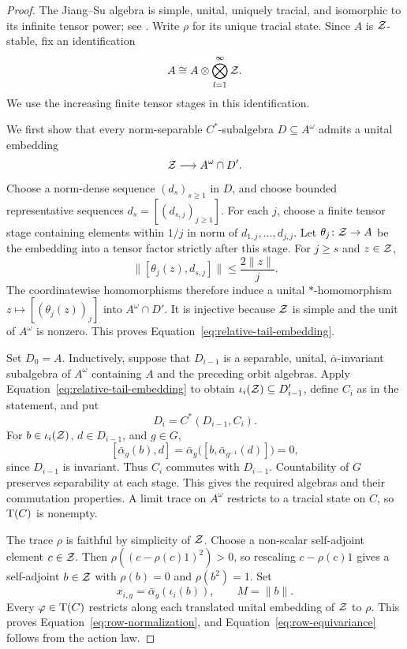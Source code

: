 \begin{proof}
The Jiang--Su algebra is simple, unital, uniquely tracial, and
isomorphic to its infinite tensor power; see
\cite[Example~1.14(iv) and Corollary~1.11]{TomsWinter2007}.
Write \(\rho\) for its unique tracial state. Since \(A\) is
\(\mathcal Z\)-stable, fix an identification
\[
 A\cong A\otimes\bigotimes_{l=1}^{\infty}\mathcal Z.
\]
We use the increasing finite tensor stages in this identification.

We first show that every norm-separable \(C^*\)-subalgebra
\(D\subseteq A^\omega\) admits a unital embedding
\begin{equation}
\label{eq:relative-tail-embedding}
 \mathcal Z\longrightarrow A^\omega\cap D'.
\end{equation}
Choose a norm-dense sequence \((d_s)_{s\geq1}\) in \(D\), and choose
bounded representative sequences
\(d_s=[(d_{s,j})_{j\geq1}]\).
For each \(j\), choose a finite tensor stage containing elements
within \(1/j\) in norm of
\(d_{1,j},\ldots,d_{j,j}\). Let
\(\theta_j\colon\mathcal Z\to A\) be the embedding into a tensor factor
strictly after this stage. For \(j\geq s\) and \(z\in\mathcal Z\),
\[
 \|[\theta_j(z),d_{s,j}]\|\leq \frac{2\|z\|}{j}.
\]
The coordinatewise homomorphisms therefore induce a unital
\(*\)-homomorphism \(z\mapsto[(\theta_j(z))_j]\) into
\(A^\omega\cap D'\). It is injective because \(\mathcal Z\) is simple
and the unit of \(A^\omega\) is nonzero. This proves
Equation~\eqref{eq:relative-tail-embedding}.

Set \(D_0=A\). Inductively, suppose that \(D_{i-1}\) is a separable,
unital, \(\bar\alpha\)-invariant subalgebra of \(A^\omega\) containing
\(A\) and the preceding orbit algebras. Apply
Equation~\eqref{eq:relative-tail-embedding} to obtain
\(\iota_i(\mathcal Z)\subseteq D_{i-1}'\), define \(C_i\) as in the
statement, and put
\[
 D_i=C^*(D_{i-1},C_i).
\]
For \(b\in\iota_i(\mathcal Z)\), \(d\in D_{i-1}\), and \(g\in G\),
\[
 [\bar\alpha_g(b),d]
 =\bar\alpha_g\bigl([b,\bar\alpha_{g^{-1}}(d)]\bigr)=0,
\]
since \(D_{i-1}\) is invariant. Thus \(C_i\) commutes with
\(D_{i-1}\). Countability of \(G\) preserves separability at each
stage. This gives the required algebras and their commutation
properties. A limit trace on \(A^\omega\) restricts to a tracial
state on \(C\), so \(\operatorname{T}(C)\) is nonempty.

The trace \(\rho\) is faithful by simplicity of \(\mathcal Z\).
Choose a non-scalar self-adjoint element \(c\in\mathcal Z\). Then
\(\rho((c-\rho(c)1)^2)>0\), so rescaling \(c-\rho(c)1\) gives
a self-adjoint \(b\in\mathcal Z\) with
\(\rho(b)=0\) and \(\rho(b^2)=1\). Set
\[
 x_{i,g}=\bar\alpha_g(\iota_i(b)),\qquad M=\|b\|.
\]
Every \(\varphi\in\operatorname{T}(C)\) restricts along each translated unital
embedding of \(\mathcal Z\) to \(\rho\). This proves
Equation~\eqref{eq:row-normalization}, and
Equation~\eqref{eq:row-equivariance} follows from the action law.
\end{proof}

